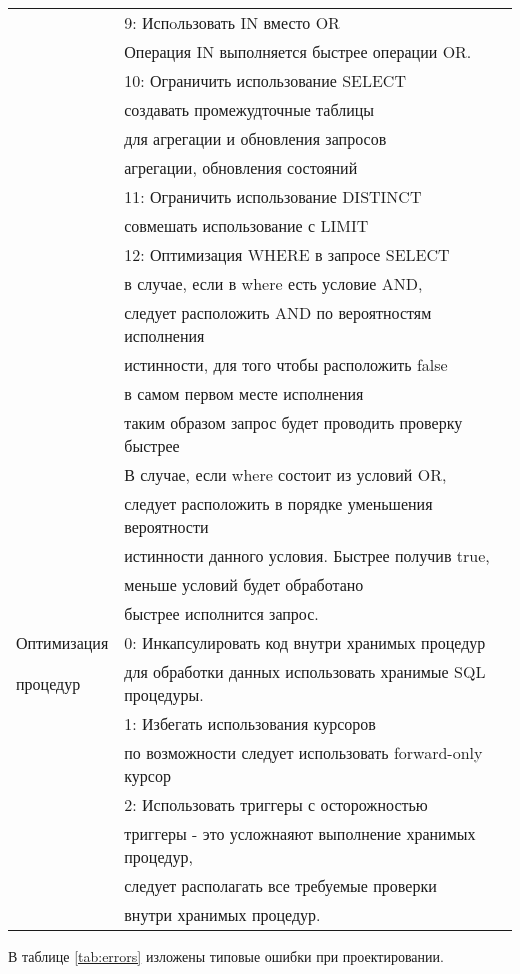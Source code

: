\begin{longtable}[c]{|l|l|}
             & 9: Испoльзовать IN вместо OR\\
             & Операция IN выполняется быстрее операции OR. \\
             & 10: Ограничить использование SELECT \\
             & создавать промежудточные таблицы \\
             & для агрегации и обновления запросов \\
             & агрегации, обновления состояний \\
             & 11: Ограничить использование DISTINCT \\
             & совмешать использование с LIMIT \\
             & 12: Оптимизация WHERE в запросе SELECT \\
             & в случае, если в where есть условие AND, \\
             & следует расположить AND по вероятностям исполнения \\
             & истинности, для того чтобы расположить false  \\
             & в самом первом месте исполнения  \\
             & таким образом запрос будет проводить проверку быстрее \\
             & В случае, если where состоит из условий OR,   \\
             & следует расположить в порядке уменьшения вероятности  \\
             & истинности данного условия. Быстрее получив true,   \\
             & меньше условий будет обработано  \\
             & быстрее исполнится запрос.  \\


    Оптимизация  & 0: Инкапсулировать код внутри хранимых процедур \\
    процедур     & для обработки данных использовать хранимые SQL процедуры.      \\
             & 1: Избегать использования курсоров                          \\
             & по возможности следует использовать forward-only курсор\\
             & 2: Использовать триггеры с осторожностью      \\
             & триггеры - это усложнаяют выполнение хранимых процедур, \\
             & следует располагать все требуемые проверки \\  
             & внутри хранимых процедур. \\

\end{longtable}
\normalsize%
\endgroup
В таблице \cref{tab:errors} изложены типовые ошибки при проектировании.

